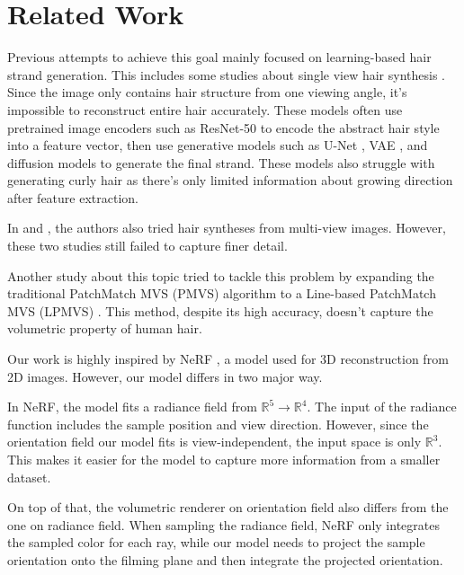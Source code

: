 \documentclass[12pt]{article}
\begin{document}
\section{Related Work}

Previous attempts to achieve this goal mainly focused on learning-based hair strand generation. This includes some studies about single view hair synthesis \cite{saito_3d_2018, zheng_hairstep_2023, wu_neuralhdhair_2022, ma_single-view_nodate}. Since the image only contains hair structure from one viewing angle, it's impossible to reconstruct entire hair accurately. These models often use pretrained image encoders such as ResNet-50 \cite{saito_3d_2018} to encode the abstract hair style into a feature vector, then use generative models such as U-Net \cite{zheng_hairstep_2023}, VAE \cite{saito_3d_2018}, and diffusion models \cite{sklyarova_neural_2023} to generate the final strand. These models also struggle with generating curly hair as there's only limited information about growing direction after feature extraction.

In \cite{sklyarova_neural_2023} and \cite{rosu_neural_2022}, the authors also tried hair syntheses from multi-view images. However, these two studies still failed to capture finer detail.

Another study about this topic tried to tackle this problem by expanding the traditional PatchMatch MVS (PMVS) algorithm to a Line-based PatchMatch MVS (LPMVS) \cite{nam_strand-accurate_nodate}. This method, despite its high accuracy, doesn't capture the volumetric property of human hair.

Our work is highly inspired by NeRF \cite{mildenhall_nerf_2020}, a model used for 3D reconstruction from 2D images. However, our model differs in two major way.

In NeRF, the model fits a radiance field from $\mathbb{R}^{5} \rightarrow \mathbb{R}^{4}$. The input of the radiance function includes the sample position and view direction. However, since the orientation field our model fits is view-independent, the input space is only $\mathbb{R}^{3}$. This makes it easier for the model to capture more information from a smaller dataset.

On top of that, the volumetric renderer on orientation field also differs from the one on radiance field. When sampling the radiance field, NeRF only integrates the sampled color for each ray, while our model needs to project the sample orientation onto the filming plane and then integrate the projected orientation.
\end{document}
